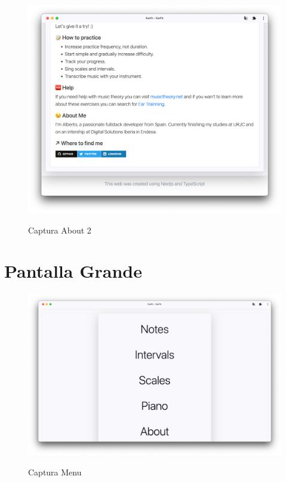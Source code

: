 \documentclass[12pt,twoside,titlepage]{report}
\begin{document}
{\begin{figure}[H]
    \centering
    \includegraphics[scale=0.3]{Capturas Earfit/Tablet/About2}
    \label{fig:TabletAbout2}
    \caption{Captura About 2}
\end{figure}

\section{Pantalla Grande}

\begin{figure}[H]
    \centering
    \includegraphics[scale=0.28]{Capturas Earfit/PC/Menu}
    \label{fig:PCMenu}
    \caption{Captura Menu}
\end{figure}

}
\end{document}
